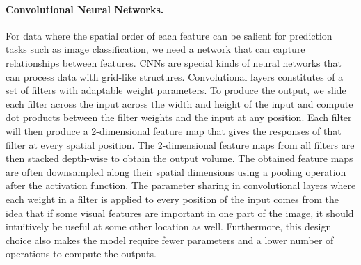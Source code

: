 \paragraph{Convolutional Neural Networks.} For data where the spatial order of each feature can be salient for prediction tasks such as image classification, we need a network that can capture relationships between features. CNNs are special kinds of neural networks that can process data with grid-like structures. Convolutional layers constitutes of a set of filters with adaptable weight parameters. To produce the output, we slide each filter across the input across the width and height of the input and compute dot products between the filter weights and the input at any position. Each filter will then produce a 2-dimensional feature map that gives the responses of that filter at every spatial position. The 2-dimensional feature maps from all filters are then stacked depth-wise to obtain the output volume. The obtained feature maps are often downsampled along their spatial dimensions using a pooling operation after the activation function. The parameter sharing in convolutional layers where each weight in a filter is applied to every position of the input comes from the idea that if some visual features are important in one part of the image, it should intuitively be useful at some other location as well. Furthermore, this design choice also makes the model require fewer parameters and a lower number of operations to compute the outputs.




